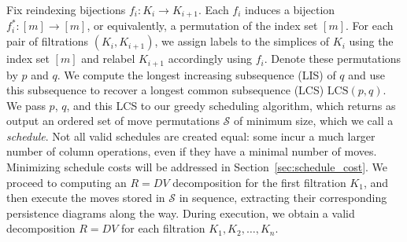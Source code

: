 \documentclass{siamart190516}
\begin{document}
Fix reindexing  bijections $f_i : K_i \to K_{i+1}$. 
Each $f_i$ induces a bijection $f_i^\ast : [m] \to [m]$, or equivalently, a permutation of the index set $[m]$. For each pair of filtrations $(K_i, K_{i+1})$, we assign labels to the simplices of $K_i$ using the index set $[m]$ and relabel $K_{i+1}$ accordingly using $f_i$. Denote these permutations by $p$ and $q$. 
We compute the longest increasing subsequence (LIS) of $q$ and use this subsequence to recover a longest common subsequence (LCS) $\mathrm{LCS}(p,q)$. We pass $p$, $q$, and this LCS to our greedy scheduling algorithm, which returns as output an ordered set of move permutations  $\mathcal{S}$ of minimum size, which we call a \emph{schedule}.
Not all valid schedules are created equal:
some incur a much larger number of column operations,
even if they have a minimal number of moves. 
Minimizing schedule costs will be addressed in 
Section~\ref{sec:schedule_cost}.
We proceed to computing an $R=DV$ decomposition for the first filtration $K_1$, and then execute the moves stored in $\mathcal{S}$ in sequence, extracting their corresponding persistence diagrams along the way. During execution, we obtain a valid decomposition $R = DV$ for each filtration $K_1, K_2, \dots, K_n$. 
\end{document}
